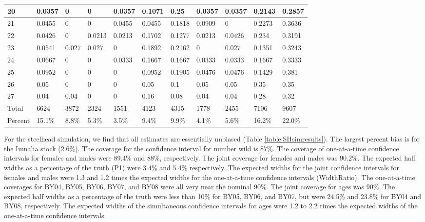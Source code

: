 \documentclass[11pt]{article}
\begin{document}
\begin{table}
{\begin{tabular}{ | l | l | l | l | l | l | l | l | l | l | l |  }
20&0.0357&0&0&0.0357&0.1071&0.25&0.0357&0.0357&0.2143&0.2857 \\ \hline
21&0.0455&0&0&0.0455&0.0455&0.1818&0.0909&0&0.2273&0.3636 \\ \hline
22&0.0426&0&0.0213&0.0213&0.1702&0.1277&0.0213&0.0426&0.234&0.3191 \\ \hline
23&0.0541&0.027&0.027&0&0.1892&0.2162&0&0.027&0.1351&0.3243 \\ \hline
24&0.0667&0&0&0.0333&0.1667&0.1667&0.0333&0.0333&0.1667&0.3333 \\ \hline
25&0.0952&0&0&0&0.0952&0.1905&0.0476&0.0476&0.1429&0.381 \\ \hline
26&0.05&0&0&0&0.05&0.1&0.05&0.05&0.35&0.35 \\ \hline
27&0.04&0.04&0&0&0.16&0.08&0.04&0.04&0.28&0.32 \\ \hline
Total&6624&3872&2324&1551&4123&4315&1778&2455&7106&9607 \\ \hline
Percent&15.1\%&8.8\%&5.3\%&3.5\%&9.4\%&9.9\%&4.1\%&5.6\%&16.2\%&22.0\% \\ \hline
\end{tabular}
}
\end{table}

For the steelhead simulation, we find that all estimates are essentially unbiased (Table \ref{table:SHsimresults}). The largest percent bias is for the Imnaha stock (2.6\%). The coverage for the confidence interval for number wild is 87\%.  The coverage of one-at-a-time confidence intervals for females and males were 89.4\% and 88\%, respectively. The joint coverage for females and males was 90.2\%. The expected half widths as a percentage of the truth (P1) were 3.4\% and 5.4\% respectively.  The expected widths for the joint confidence intervals for females and males were 1.3 and 1.2 times the expected widths for the one-at-a-time confidence intervals (WidthRatio). The one-at-a-time coverages for BY04, BY05, BY06, BY07, and BY08 were all very near the nominal 90\%. The joint coverage for ages was 90\%.  The expected half widths as a percentage of the truth were less than 10\% for BY05, BY06, and BY07, but were 24.5\% and 23.8\% for BY04 and BY08, respectively. The expected widths of the simultaneous confidence intervals for ages were 1.2 to 2.2 times the expected widths of the one-at-a-time confidence intervals.
\end{document}
